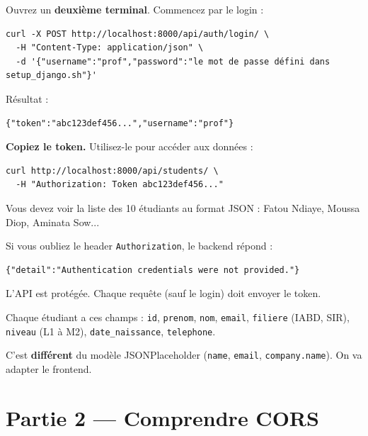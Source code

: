 \documentclass[11pt,a4paper]{article}
\begin{document}
Ouvrez un \textbf{deuxième terminal}. Commencez par le login :

\begin{lstlisting}[style=terminal]
curl -X POST http://localhost:8000/api/auth/login/ \
  -H "Content-Type: application/json" \
  -d '{"username":"prof","password":"le mot de passe défini dans setup_django.sh"}'
\end{lstlisting}

Résultat :

\begin{lstlisting}[style=terminal]
{"token":"abc123def456...","username":"prof"}
\end{lstlisting}

\textbf{Copiez le token.} Utilisez-le pour accéder aux données :

\begin{lstlisting}[style=terminal]
curl http://localhost:8000/api/students/ \
  -H "Authorization: Token abc123def456..."
\end{lstlisting}

Vous devez voir la liste des 10 étudiants au format JSON : Fatou Ndiaye, Moussa Diop, Aminata Sow...

\begin{attentionbox}[Sans le token --- erreur 401]
Si vous oubliez le header \texttt{Authorization}, le backend répond :

\begin{lstlisting}[style=terminal]
{"detail":"Authentication credentials were not provided."}
\end{lstlisting}

L'API est protégée. Chaque requête (sauf le login) doit envoyer le token.
\end{attentionbox}

\begin{retenirbox}
Chaque étudiant a ces champs : \texttt{id}, \texttt{prenom}, \texttt{nom}, \texttt{email}, \texttt{filiere} (IABD, SIR), \texttt{niveau} (L1 à M2), \texttt{date\_naissance}, \texttt{telephone}.

C'est \textbf{différent} du modèle JSONPlaceholder (\texttt{name}, \texttt{email}, \texttt{company.name}). On va adapter le frontend.
\end{retenirbox}

\section{Partie 2 --- Comprendre CORS}
\end{document}
